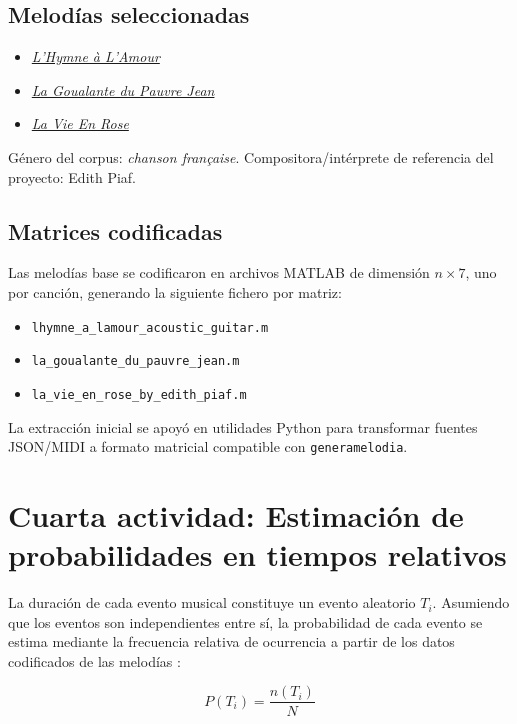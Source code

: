 \documentclass{article}
\theoremstyle{plain}
\theoremstyle{definition}
\begin{document}
\subsection*{Melodías seleccionadas}
\begin{itemize}
	\item \href{https://www.songsterr.com/a/wsa/edith-piaf-lhymne-a-lamour-tab-s33753}{\textit{L'Hymne à L'Amour}}
	\item \href{https://www.songsterr.com/a/wsa/edith-piaf-la-goualante-du-pauvre-jean-tab-s16146}{\textit{La Goualante du Pauvre Jean}}
	\item \href{https://www.songsterr.com/a/wsa/misc-covers-la-vie-en-rose-by-edith-piaf-guitar-logic-tab-s464099}{\textit{La Vie En Rose}}
\end{itemize}

Género del corpus: \textit{chanson française}. Compositora/intérprete de referencia del proyecto: Edith Piaf.

\subsection*{Matrices codificadas}
Las melodías base se codificaron en archivos MATLAB de dimensión \(n\times 7\), uno por canción, generando la siguiente fichero por matriz:
\begin{itemize}
	\item {\texttt{lhymne\_a\_lamour\_acoustic\_guitar.m}}
	\item {\texttt{la\_goualante\_du\_pauvre\_jean.m}}
	\item {\texttt{la\_vie\_en\_rose\_by\_edith\_piaf.m}}
\end{itemize}
La extracción inicial se apoyó en utilidades Python para transformar fuentes JSON/MIDI a formato matricial compatible con \texttt{generamelodia}.

\section*{Cuarta actividad: Estimación de probabilidades en tiempos relativos}

La duración de cada evento musical constituye un evento aleatorio $T_i$. Asumiendo que los
eventos son independientes entre sí, la probabilidad de cada evento se estima mediante la
frecuencia relativa de ocurrencia a partir de los datos codificados de las melodías
\cite{bertsekas, walpole}:

\[
	P(T_i) = \frac{n(T_i)}{N}
\]
\end{document}
